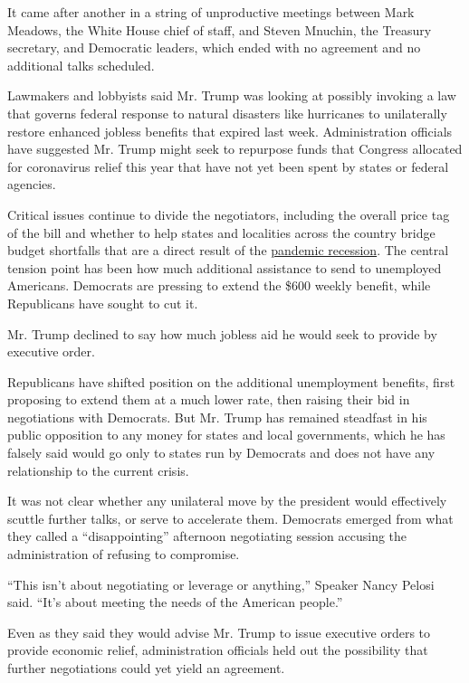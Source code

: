 It came after another in a string of unproductive meetings between Mark
Meadows, the White House chief of staff, and Steven Mnuchin, the
Treasury secretary, and Democratic leaders, which ended with no
agreement and no additional talks scheduled.

Lawmakers and lobbyists said Mr. Trump was looking at possibly invoking
a law that governs federal response to natural disasters like hurricanes
to unilaterally restore enhanced jobless benefits that expired last
week. Administration officials have suggested Mr. Trump might seek to
repurpose funds that Congress allocated for coronavirus relief this year
that have not yet been spent by states or federal agencies.

Critical issues continue to divide the negotiators, including the
overall price tag of the bill and whether to help states and localities
across the country bridge budget shortfalls that are a direct result of
the
\href{https://www.nytimes.com/2020/06/08/business/economy/us-economy-recession-2020.html}{pandemic
recession}. The central tension point has been how much additional
assistance to send to unemployed Americans. Democrats are pressing to
extend the \$600 weekly benefit, while Republicans have sought to cut
it.

Mr. Trump declined to say how much jobless aid he would seek to provide
by executive order.

Republicans have shifted position on the additional unemployment
benefits, first proposing to extend them at a much lower rate, then
raising their bid in negotiations with Democrats. But Mr. Trump has
remained steadfast in his public opposition to any money for states and
local governments, which he has falsely said would go only to states run
by Democrats and does not have any relationship to the current crisis.

It was not clear whether any unilateral move by the president would
effectively scuttle further talks, or serve to accelerate them.
Democrats emerged from what they called a ``disappointing'' afternoon
negotiating session accusing the administration of refusing to
compromise.

``This isn't about negotiating or leverage or anything,'' Speaker Nancy
Pelosi said. ``It's about meeting the needs of the American people.''

Even as they said they would advise Mr. Trump to issue executive orders
to provide economic relief, administration officials held out the
possibility that further negotiations could yet yield an agreement.


